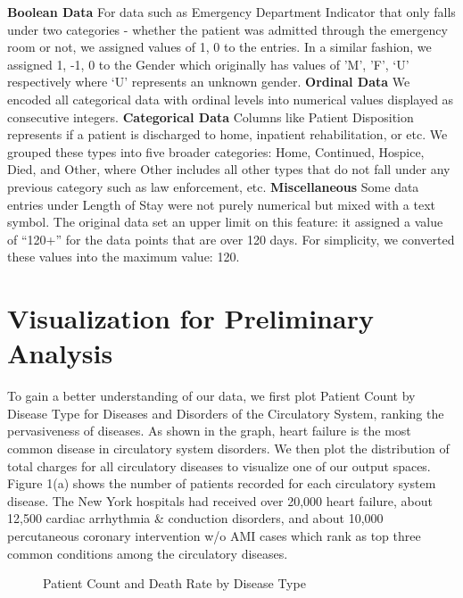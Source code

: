 \documentclass[12pt]{article}
\begin{document}
\newline \textbf{Boolean Data} For data such as Emergency Department Indicator that only falls under two categories - whether the patient was admitted through the emergency room or not, we assigned values of {1, 0} to the entries. In a similar fashion, we assigned {1, -1, 0} to the Gender which originally has values of {’M’, ’F’, ‘U’} respectively where ‘U’ represents an unknown gender. \bigskip
\newline  \textbf{Ordinal Data} We encoded all categorical data with ordinal levels into numerical values displayed as consecutive integers. \bigskip
\newline \textbf{Categorical Data} Columns like Patient Disposition represents if a patient is discharged to home, inpatient rehabilitation, or etc. We grouped these types into five broader categories: Home, Continued, Hospice, Died, and Other, where Other includes all other types that do not fall under any previous category such as law enforcement, etc. \bigskip
\newline \textbf{Miscellaneous} Some data entries under Length of Stay were not purely numerical but mixed with a text symbol. The original data set an upper limit on this feature: it assigned a value of “120+” for the data points that are over 120 days. For simplicity, we converted these values into the maximum value: 120.

\section{Visualization for Preliminary Analysis}

To gain a better understanding of our data, we first plot Patient Count by Disease Type for Diseases and Disorders of the Circulatory System, ranking the pervasiveness of diseases. As shown in the graph, heart failure is the most common disease in circulatory system disorders. We then plot the distribution of total charges for all circulatory diseases to visualize one of our output spaces. \bigskip
\newline Figure 1(a) shows the number of patients recorded for each circulatory system disease. The New York hospitals had received over 20,000 heart failure, about 12,500 cardiac arrhythmia \& conduction disorders, and about 10,000 percutaneous coronary intervention w/o AMI cases which rank as top three common conditions among the circulatory diseases. 

\begin{figure}[H]
 
  \hfill
  \caption{Patient Count and Death Rate by Disease Type}
\end{figure}
\end{document}
